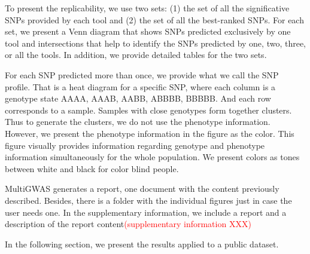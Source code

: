 To present the replicability, we use two sets: (1) the set of all the significative SNPs provided by each tool and (2) the set of all the best-ranked SNPs. For each set, we present a Venn diagram that shows SNPs predicted exclusively by one tool and intersections that help to identify the SNPs predicted by one, two, three, or all the tools. In addition, we provide detailed tables for the two sets.

For each SNP predicted more than once, we provide what we call the SNP profile. That is a heat diagram for a specific SNP, where each column is a genotype state AAAA, AAAB, AABB, ABBBB, BBBBB. And each row corresponds to a sample. Samples with close genotypes form together clusters. Thus to generate the clusters, we do not use the phenotype information. However, we present the phenotype information in the figure as the color. This figure visually provides information regarding genotype and phenotype information simultaneously for the whole population. We present colors as tones between white and black for color blind people. 


MultiGWAS generates a report, one document with the content previously described. Besides, there is a folder with the individual figures just in case the user needs one. In the supplementary information, we include a report and a description of the report content\textcolor{red}{(supplementary information XXX)}


In the following section, we present the results applied to a public dataset. 
